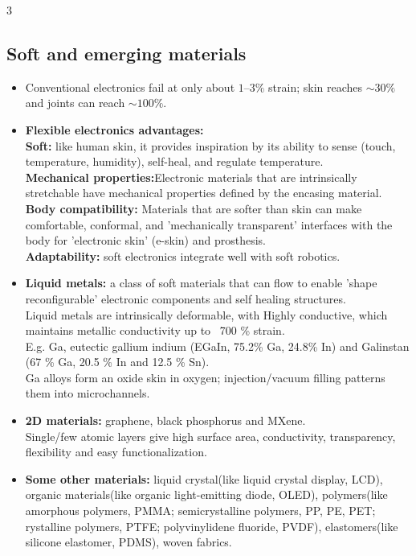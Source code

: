 \documentclass[10pt,a4paper]{ctexart}
\newcommand{\key}[1]{\textbf{#1}}
\begin{document}
\begin{multicols*}{3}
\subsection{Soft and emerging materials}
\begin{itemize}
  \item Conventional electronics fail at only about $1$--$3\%$ strain;
  skin reaches $\sim30\%$ and joints can reach $\sim100\%$.
  \item \key{Flexible electronics advantages:}\\
  \key{Soft:} like human skin, it provides inspiration by its ability to sense 
  (touch, temperature, humidity), self-heal, and regulate temperature.\\
  \key{Mechanical properties:}Electronic materials that are intrinsically stretchable 
  have mechanical properties defined by the encasing material.\\
  \key{Body compatibility:} Materials that are softer than skin can make comfortable, 
  conformal, and 'mechanically transparent' interfaces with the body for 
  'electronic skin' (e-skin) and prosthesis.\\
  \key{Adaptability:} soft electronics integrate well with soft robotics.
  \item \key{Liquid metals:} a class of soft materials that can flow to enable 
  'shape reconfigurable' electronic components and self healing structures.\\
  Liquid metals are intrinsically deformable, with Highly conductive, 
  which maintains metallic conductivity up to ~700 \% strain.\\
  E.g. Ga, eutectic gallium indium (EGaIn, 75.2\% Ga, 24.8\% In) and Galinstan
  (67 \% Ga, 20.5 \% In and 12.5 \% Sn).\\
  Ga alloys form an oxide skin in oxygen; injection/vacuum filling patterns
  them into microchannels.
  \item \key{2D materials:} graphene, black phosphorus and MXene.\\
  Single/few atomic layers give high surface area, conductivity,
  transparency, flexibility and easy functionalization.\\
  \item \key{Some other materials:} liquid crystal(like liquid crystal display, LCD),
  organic materials(like organic light-emitting diode, OLED), 
  polymers(like amorphous polymers, PMMA; semicrystalline polymers, 
  PP, PE, PET; rystalline polymers, PTFE; polyvinylidene fluoride, PVDF),
  elastomers(like silicone elastomer, PDMS), woven fabrics.
\end{itemize}



\end{multicols*}
\end{document}
